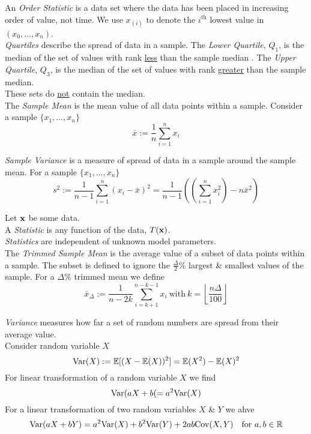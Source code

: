 \documentclass[11pt,a4paper]{article}
\begin{document}
An \textit{Order Statistic} is a data set where the data has been placed in increasing order of value, not time. We use $x_{(i)}$ to denote the $i^\text{th}$ lowest value in $(x_0,\dots,x_n)$.\\

\textit{Quartiles} describe the spread of data in a sample.  The \textit{Lower Quartile}, $Q_1$, is the median of the set of values with rank \underline{less} than the sample median . The \textit{Upper Quartile}, $Q_3$, is the median of the set of values with rank \underline{greater} than the sample median.\\
\nb These sets do \underline{not} contain the median.\\

The \textit{Sample Mean} is the mean value of all data points within a sample. Consider a sample $\{x_1,\dots,x_n\}$
$$\bar{x}:=\frac{1}{n}\sum_{i=1}^nx_i$$

\textit{Sample Variance} is a measure of spread of data in a sample around the sample mean. For a sample $\{x_1,\dots,x_n\}$
$$s^2:=\frac{1}{n-1}\sum_{i=1}^n(x_i-\bar{x})^2=\frac{1}{n-1}\left(\left(\sum_{i=1}^nx_i^2\right)-n\bar{x}^2\right)$$

Let $\textbf{x}$ be some data.\\
A \textit{Statistic} is any function of the data, $T(\textbf{x})$.\\
\nb \textit{Statistics} are independent of unknown model parameters.\\

The \textit{Trimmed Sample Mean} is the average value of a subset of data points within a sample. The subset is defined to ignore the $\frac{\Delta}{2}\%$ largest \& smallest values of the sample. For a $\Delta\%$ trimmed mean we define
$$\bar{x}_\Delta:=\frac{1}{n-2k}\sum_{i=k+1}^{n-k-1}x_i\ \mathrm{with}\ k=\left\lfloor\frac{n\Delta}{100}\right\rfloor$$

\textit{Variance} measures how far a set of random numbers are spread from their average value.\\
Consider random variable $X$
$$\mathrm{Var}(X):=\mathbb{E}[(X-\mathbb{E}(X))^2]=\mathbb{E}(X^2)-\mathbb{E}(X)^2$$
For linear transformation of a random variable $X$ we find
$$\mathrm{Var}(aX+b(=a^2\mathrm{Var}(X)$$
For a linear transformation of two random variables $X$ \& $Y$ we ahve
$$\mathrm{Var}(aX+bY)=a^2\mathrm{Var}(X)+b^2\mathrm{Var}(Y)+2ab\mathrm{Cov}(X,Y)\quad\text{for }a,b\in\mathbb{R}$$
\end{document}
